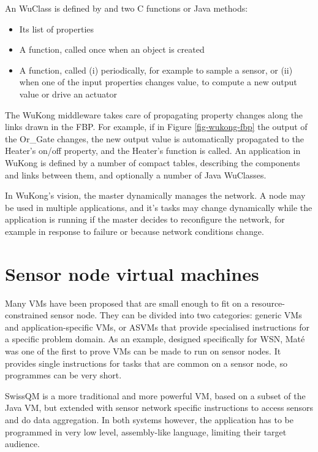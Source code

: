 An WuClass is defined by  and two C functions or Java methods:
\begin{itemize}
	\item Its list of properties
	\item A  function, called once when an object is created
	\item A  function, called (i) periodically, for example to sample a sensor, or (ii) when one of the input properties changes value, to compute a new output value or drive an actuator
\end{itemize}

The WuKong middleware takes care of propagating property changes along the links drawn in the FBP. For example, if in Figure \ref{fig-wukong-fbp} the output of the Or\_Gate changes, the new output value is automatically propagated to the Heater's on/off property, and the Heater's  function is called. An application in WuKong is defined by a number of compact tables, describing the components and links between them, and optionally a number of Java WuClasses.

In WuKong's vision, the master dynamically manages the network. A node may be used in multiple applications, and it's tasks may change dynamically while the application is running if the master decides to reconfigure the network, for example in response to failure \cite{Su:2014uf} or because network conditions change.


\section{Sensor node virtual machines}
Many VMs have been proposed that are small enough to fit on a resource-constrained sensor node. They can be divided into two categories: generic VMs and application-specific VMs, or ASVMs \cite{Culler05} that provide specialised instructions for a specific problem domain. As an example, designed specifically for WSN, Mat\'e \cite{Levis:2002ku} was one of the first to prove VMs can be made to run on sensor nodes. It provides single instructions for tasks that are common on a sensor node, so programmes can be very short.  

SwissQM \cite{Muller:2007fs} is a more traditional and more powerful VM, based on a subset of the Java VM, but extended with sensor network specific instructions to access sensors and do data aggregation. In both systems however, the application has to be programmed in very low level, assembly-like language, limiting their target audience.

